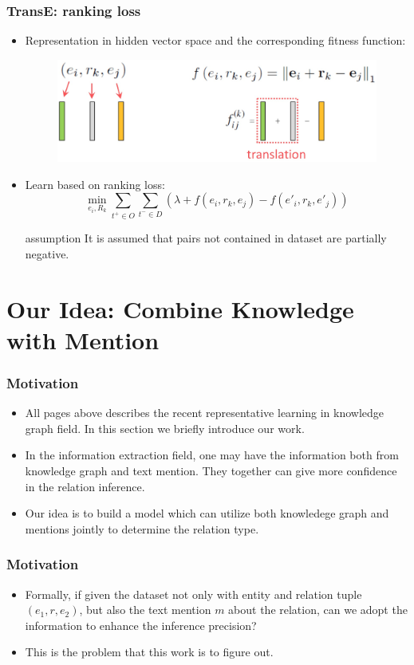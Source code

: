 \documentclass[pdf,10pt]{beamer}
\begin{document}
\begin{frame}
\frametitle{TransE: ranking loss}
\begin{itemize}
	\item Representation in hidden vector space and the corresponding fitness function:
		\begin{figure}
			\includegraphics[height=0.20\textwidth]{6.eps}
		\end{figure}
	\item Learn based on ranking loss:
		$$\min_{e_i,R_k}\sum_{t^+ \in O}\sum_{t^- \in D}{(\lambda + f(e_i,r_k,e_j) - f(e'_i,r_k,e'_j))}$$
	\begin{exampleblock}{assumption}
		It is assumed that pairs not contained in dataset are partially negative.
	\end{exampleblock}
\end{itemize}
\end{frame}

\section{Our Idea: Combine Knowledge with Mention}

\begin{frame}
\frametitle{Motivation}
    \begin{itemize}
        \item All pages above describes the recent representative  learning in knowledge graph field. In this section we briefly introduce our work.
        \item In the information extraction field, one may have the information both from knowledge graph and text mention. They together can give more confidence in the relation inference.
        \item Our idea is to build a model which can utilize both knowledege graph and mentions jointly to determine the relation type.
    \end{itemize}
\end{frame}

\begin{frame}
    \frametitle{Motivation}
    \begin{itemize}
        \item Formally, if given the dataset not only with entity and relation tuple $(e_1, r, e_2)$, but also the text mention $m$ about the relation, can we adopt the information to enhance the inference precision?
        \item This is the problem that this work is to figure out.
    \end{itemize}
\end{frame}
\end{document}

